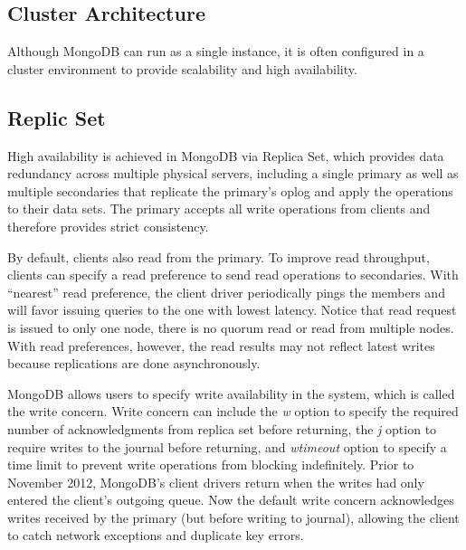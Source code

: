 \documentclass[12pt]{book}
\begin{document}
\subsection{Cluster Architecture}

Although MongoDB can run as a single instance, it is often configured in a cluster environment to provide scalability and high availability.

\subsection{Replic Set}
High availability is achieved in MongoDB via Replica Set, which provides data redundancy across multiple physical servers, including a single primary as well as multiple secondaries that replicate the primary's oplog and apply the operations to their data sets. The primary accepts all write operations from clients and therefore provides strict consistency. 

By default, clients also read from the primary. To improve read throughput, clients can specify a read preference to send read operations to secondaries. With ``nearest'' read preference, the client driver periodically pings the members and will favor issuing queries to the one with lowest latency. Notice that read request is issued to only one node, there is no quorum read or read from multiple nodes. With read preferences, however, the read results may not reflect latest writes because replications are done asynchronously. 

MongoDB allows users to specify write availability in the system, which is called the write concern. Write concern can include the {\em w} option to specify the required number of acknowledgments from replica set before returning, the {\em j} option to require writes to the journal before returning, and {\em wtimeout} option to specify a time limit to prevent write operations from blocking indefinitely. Prior to November 2012, MongoDB's client drivers return when the writes had only entered the client's outgoing queue. Now the default write concern acknowledges writes received by the primary (but before writing to journal), allowing the client to catch network exceptions and duplicate key errors. 
\end{document}
